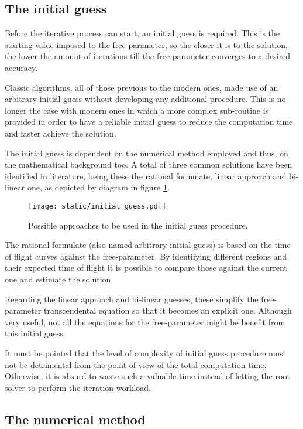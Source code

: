 \subsection{The initial guess}

Before the iterative process can start, an initial guess is required. This is
the starting value imposed to the free-parameter, so the closer it is to the
solution, the lower the amount of iterations till the free-parameter converges
to a desired accuracy.

Classic algorithms, all of those previous to the modern ones, made use of an
arbitrary initial guess without developing any additional procedure. This is no
longer the case with modern ones in which a more complex sub-routine is provided
in order to have a reliable initial guess to reduce the computation time and
faster achieve the solution.

The initial guess is dependent on the numerical method employed and thus, on the
mathematical background too. A total of three common solutions have been
identified in literature, being these the rational formulate, linear approach
and bi-linear one, as depicted by diagram in figure \ref{fig:initial_guess}.

\vspace{0.5cm}
\begin{figure}[h]
  \centering
  \texttt{[image: static/initial\_guess.pdf]}
  \caption{Possible approaches to be used in the initial guess procedure.}
  \label{fig:initial_guess}
\end{figure}

The rational formulate (also named arbitrary initial guess) is based on the time
of flight curves against the free-parameter. By identifying different regions
and their expected time of flight it is possible to compare those against the
current one and estimate the solution.

Regarding the linear approach and bi-linear guesses, these simplify the
free-parameter transcendental equation so that it becomes an explicit one.
Although very useful, not all the equations for the free-parameter might be
benefit from this initial guess.

It must be pointed that the level of complexity of initial guess procedure must
not be detrimental from the point of view of the total computation time.
Otherwise, it is absurd to waste such a valuable time instead of letting the
root solver to perform the iteration workload.

\subsection{The numerical method}

